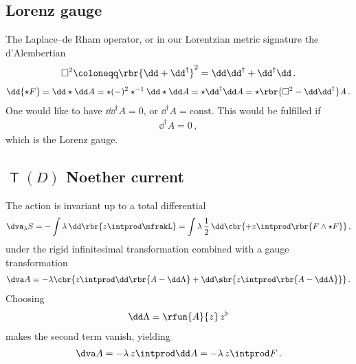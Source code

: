 \documentclass[a4paper]{article}
\begin{document}
\subsection{Lorenz gauge}
The Laplace--de Rham operator, or in our Lorentzian metric signature the 
d'Alembertian
\begin{align}
\square^2 \coloneqq \rbr{\dd + \dd^{\dagger}}^2 =
	\dd \dd^{\dagger} + \dd^{\dagger} \dd\,.
\end{align}
\begin{align}
\dd{\star F} = \dd\star \dd A = \star (-)^2 \star^{-1}\dd\star\dd A =
	\star \dd^{\dagger} \dd A = \star\rbr{\square^2 - \dd \dd^{\dagger}} A\,.
\end{align}
One would like to have $\dd \dd^{\dagger} A = 0$, or $\dd^{\dagger} A = 
\text{const}$. This would be fulfilled if
\begin{align}
\dd^{\dagger} A = 0\,,
\end{align}
which is the Lorenz gauge\cite{Lorenz1867,Bladel1991a,Bladel1991b}.

\subsection[$T(D)$ Noether current]{$\msansT(D)$ Noether current}

The action is invariant up to a total differential
\begin{align}
\dva_{\lambda} S = - \int \lambda\,\dd\rbr{z \intprod \mfrakL}
= \int \lambda\,\frac{1}{2}\,\dd\cbr{
	+ z\intprod \rbr{F\wedge\star F} }\,,
\label{eq:tot-diff-em-10}
\end{align}
under the rigid infinitesimal transformation combined with a gauge 
transformation \cite[eq.\ 3.46]{Scheck2017}
\begin{align}
\dva A = - \lambda\cbr{z\intprod \dd \rbr{A-\dd\Lambda} + 
	\dd\sbr{z\intprod\rbr{A-\dd\Lambda}}}\,.
\end{align}
Choosing
\begin{align}
\dd\Lambda = \rfun{A}{z}\,z^{\flat}
\end{align}
makes the second term vanish, yielding
\begin{align}
\dva A = - \lambda\,z\intprod \dd A = - \lambda\,z\intprod F \,.
\end{align}
\end{document}
